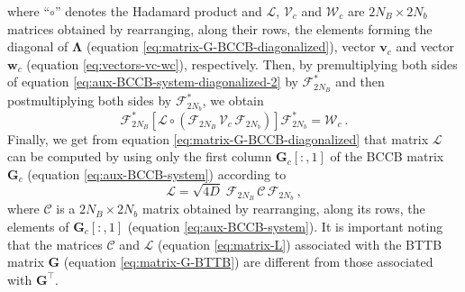 \documentclass[utf8]{FrontiersinHarvard} %
\begin{document}
	where ``$\circ$'' denotes the Hadamard product \cite[e.g.,][p. 298]{horn-johnson1991} and 
	$\boldsymbol{\mathcal{L}}$, $\boldsymbol{\mathcal{V}}_{c}$ and $\boldsymbol{\mathcal{W}}_{c}$ are 
	$2N_{B} \times 2N_{b}$ matrices obtained 
	by rearranging, along their rows, the elements forming the diagonal of 
	$\boldsymbol{\Lambda}$ (equation \ref{eq:matrix-G-BCCB-diagonalized}), vector $\mathbf{v}_{c}$ and 
	vector $\mathbf{w}_{c}$ (equation \ref{eq:vectors-vc-wc}), respectively.
	Then, by premultiplying both sides of equation \ref{eq:aux-BCCB-system-diagonalized-2} 
	by $\boldsymbol{\mathcal{F}}_{2N_{B}}^{\ast}$ and then postmultiplying both sides by 
	$\boldsymbol{\mathcal{F}}_{2N_{b}}^{\ast}$, we obtain
	\begin{equation}
		\boldsymbol{\mathcal{F}}_{2N_{B}}^{\ast} \left[ \boldsymbol{\mathcal{L}} \circ 
		\left( \boldsymbol{\mathcal{F}}_{2N_{B}} \, \boldsymbol{\mathcal{V}}_{c} \, \boldsymbol{\mathcal{F}}_{2N_{b}} \right)
		\right] \boldsymbol{\mathcal{F}}_{2N_{b}}^{\ast} = \boldsymbol{\mathcal{W}}_{c} \: .
		\label{eq:aux-BCCB-system-diagonalized-3}
	\end{equation}
	Finally, we get from equation \ref{eq:matrix-G-BCCB-diagonalized} that 
	matrix $\boldsymbol{\mathcal{L}}$ can be computed by using only the first column 
	$\mathbf{G}_{c}[:,1]$ of the BCCB matrix $\mathbf{G}_{c}$ (equation \ref{eq:aux-BCCB-system})
	according to \citep{takahashi-etal2020}
	\begin{equation}
		\boldsymbol{\mathcal{L}} = \sqrt{4D} \; 
		\boldsymbol{\mathcal{F}}_{2N_{B}} \, \boldsymbol{\mathcal{C}} \, \boldsymbol{\mathcal{F}}_{2N_{b}} \: ,
		\label{eq:matrix-L}
	\end{equation}
	where $\boldsymbol{\mathcal{C}}$ is a $2N_{B} \times 2N_{b}$ matrix obtained 
	by rearranging, along its rows, the elements of $\mathbf{G}_{c}[:,1]$ (equation \ref{eq:aux-BCCB-system}).
	It is important noting that the matrices $\boldsymbol{\mathcal{C}}$ and $\boldsymbol{\mathcal{L}}$ (equation \ref{eq:matrix-L}) 
	associated with the BTTB matrix $\mathbf{G}$ (equation \ref{eq:matrix-G-BTTB}) are different from those associated with $\mathbf{G}^{\top}$.
	
\end{document}
